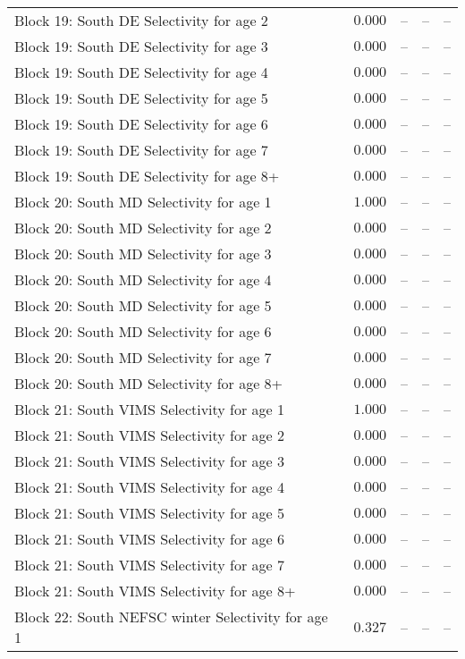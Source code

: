 \documentclass[
]{article}
\begin{document}
\begin{landscape}
\begin{longtable}[t]{lrrrr}
Block 19: South DE Selectivity for age 2 & $0.000$ & -- & -- & --\\
Block 19: South DE Selectivity for age 3 & $0.000$ & -- & -- & --\\
Block 19: South DE Selectivity for age 4 & $0.000$ & -- & -- & --\\
Block 19: South DE Selectivity for age 5 & $0.000$ & -- & -- & --\\
\addlinespace
Block 19: South DE Selectivity for age 6 & $0.000$ & -- & -- & --\\
Block 19: South DE Selectivity for age 7 & $0.000$ & -- & -- & --\\
Block 19: South DE Selectivity for age 8+ & $0.000$ & -- & -- & --\\
Block 20: South MD Selectivity for age 1 & $1.000$ & -- & -- & --\\
Block 20: South MD Selectivity for age 2 & $0.000$ & -- & -- & --\\
\addlinespace
Block 20: South MD Selectivity for age 3 & $0.000$ & -- & -- & --\\
Block 20: South MD Selectivity for age 4 & $0.000$ & -- & -- & --\\
Block 20: South MD Selectivity for age 5 & $0.000$ & -- & -- & --\\
Block 20: South MD Selectivity for age 6 & $0.000$ & -- & -- & --\\
Block 20: South MD Selectivity for age 7 & $0.000$ & -- & -- & --\\
\addlinespace
Block 20: South MD Selectivity for age 8+ & $0.000$ & -- & -- & --\\
Block 21: South VIMS Selectivity for age 1 & $1.000$ & -- & -- & --\\
Block 21: South VIMS Selectivity for age 2 & $0.000$ & -- & -- & --\\
Block 21: South VIMS Selectivity for age 3 & $0.000$ & -- & -- & --\\
Block 21: South VIMS Selectivity for age 4 & $0.000$ & -- & -- & --\\
\addlinespace
Block 21: South VIMS Selectivity for age 5 & $0.000$ & -- & -- & --\\
Block 21: South VIMS Selectivity for age 6 & $0.000$ & -- & -- & --\\
Block 21: South VIMS Selectivity for age 7 & $0.000$ & -- & -- & --\\
Block 21: South VIMS Selectivity for age 8+ & $0.000$ & -- & -- & --\\
Block 22: South NEFSC winter Selectivity for age 1 & $0.327$ & -- & -- & --\\

\end{longtable}
\end{landscape}
\end{document}
